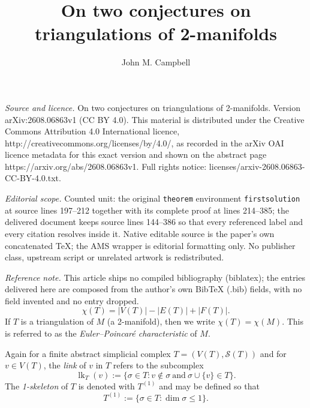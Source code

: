 \documentclass[10pt,a4paper]{amsart}
\begin{document}
\title[On two conjectures on triangulations of 2-manifolds]{On two conjectures on triangulations of 2-manifolds}
\author{John M. Campbell}
\date{}
\maketitle
\noindent\emph{Source and licence.} On two conjectures on triangulations of 2-manifolds. Version arXiv:2608.06863v1 (CC BY 4.0). This material is distributed under the Creative Commons Attribution 4.0 International licence, http://creativecommons.org/licenses/by/4.0/, as recorded in the arXiv OAI licence metadata for this exact version and shown on the abstract page https://arxiv.org/abs/2608.06863v1. Full rights notice: licenses/arxiv-2608.06863-CC-BY-4.0.txt.\par\smallskip
\noindent\textit{Editorial scope.} Counted unit: the original \texttt{theorem} environment \texttt{firstsolution} at source lines 197--212 together with its complete proof at lines 214--385; the delivered document keeps source lines 144--386 so that every referenced label and every citation resolves inside it. Native editable source is the paper's own concatenated TeX; the AMS wrapper is editorial formatting only. No publisher class, upstream script or unrelated artwork is redistributed.
\par\smallskip\noindent\textit{Reference note.} This article ships no compiled bibliography (biblatex); the entries delivered here are composed from the author's own BibTeX (.bib) fields, with no field invented and no entry dropped.
\begin{equation}\label{EulerPoincare}
 \chi(T) = |V(T)| - |E(T)| + |F(T)|. 
\end{equation}
 If $T$ is a triangulation of $M$ (a 2-manifold), 
 then we write $\chi(T) = \chi(M)$. This is referred to as the \emph{Euler--Poincar\'{e} characteristic} of $M$. 

 Again for a finite abstract simplicial complex $T = (V(T), \mathcal{S}(T))$ and for $v \in V(T)$, the \emph{link} of $v$ in $T$
 refers to the subcomplex
\begin{equation}\label{definelk} 
 \operatorname{lk}_{T}(v) := \{ \sigma \in T : v \not\in \sigma \ \text{and} \ \sigma \cup \{ v \} \in T \}. 
\end{equation}
 The \emph{1-skeleton} of $T$ is denoted with $T^{(1)}$
 and may be defined so that 
\begin{equation}\label{defineskeleton}
 T^{(1)} := \{ \sigma \in T : \dim \sigma \leq 1 \}. 
\end{equation}
\end{document}

